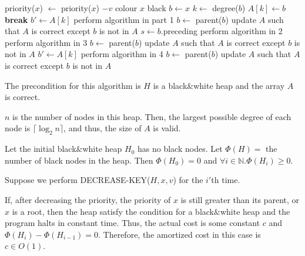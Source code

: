 \documentclass[10pt]{article}
\begin{document}
\begin{enumerate}
		\begin{algorithmic}[1]
				\State priority($x$) $\gets$ priority($x$) $- v$
						\State colour $x$ black
						\State $b \gets x$
							\State $k \gets$ degree($b$)
									\State $A[k] \gets b$
									\State \textbf{break}
								\Else
									\State $b' \gets A[k]$
									\State perform algorithm in part 1
										\State $b \gets$ parent($b$)
									\EndIf
									\State update $A$ such that $A$ is correct
										except $b$ is not in $A$
								\EndIf
							\Else
								\State $s \gets b$.preceding 
										\State perform algorithm in 2
									\Else
										\State perform algorithm in 3
									\EndIf
										\State $b \gets$ parent($b$)
									\EndIf
									\State update $A$ such that $A$ is correct
										except $b$ is not in $A$
								\Else
									\State $b' \gets A[k]$
									\State perform algorithm in 4
										\State $b \gets$ parent($b$)
									\EndIf
									\State update $A$ such that $A$ is correct
										except $b$ is not in $A$
								\EndIf
							\EndIf
						\EndWhile
					\EndIf
				\EndIf
			\EndFunction
		\end{algorithmic}

		The precondition for this algorithm is $H$ is a black$\&$white heap and
		the array $A$ is correct.

		$n$ is the number of nodes in this heap.
		Then, the largest possible degree of each node is $\lceil \log_2 n
		\rceil$, and thus, the size of $A$ is valid.

		Let the initial black$\&$white heap $H_0$ has no black nodes.
		Let $\Phi(H) =$ the number of black nodes in the heap.
		Then $\Phi(H_0) = 0$ and $\forall i \in \mathbb{N}. \Phi(H_i) \geq 0$.

		Suppose we perform DECREASE-KEY($H,x,v$) for the $i'$th time.

		If, after decreasing the priority, the priority of $x$ is still greater
		than its parent, or $x$ is a root, then the heap satisfy the condition
		for a black$\&$white heap and the program halts in constant time.
		Thus, the actual cost is some constant $c$ and $\Phi(H_i) -
		\Phi(H_{i-1}) = 0$.
		Therefore, the amortized cost in this case is $c \in O(1)$.


\end{enumerate}
\end{document}
